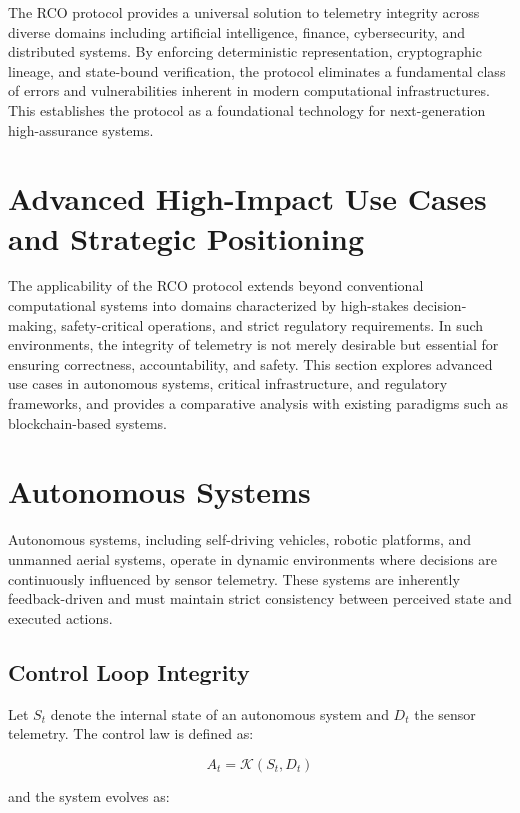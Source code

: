 The RCO protocol provides a universal solution to telemetry integrity across diverse domains including artificial intelligence, finance, cybersecurity, and distributed systems. By enforcing deterministic representation, cryptographic lineage, and state-bound verification, the protocol eliminates a fundamental class of errors and vulnerabilities inherent in modern computational infrastructures. This establishes the protocol as a foundational technology for next-generation high-assurance systems.

\section{Advanced High-Impact Use Cases and Strategic Positioning}

The applicability of the RCO protocol extends beyond conventional computational systems into domains characterized by high-stakes decision-making, safety-critical operations, and strict regulatory requirements. In such environments, the integrity of telemetry is not merely desirable but essential for ensuring correctness, accountability, and safety. This section explores advanced use cases in autonomous systems, critical infrastructure, and regulatory frameworks, and provides a comparative analysis with existing paradigms such as blockchain-based systems.

\section{Autonomous Systems}

Autonomous systems, including self-driving vehicles, robotic platforms, and unmanned aerial systems, operate in dynamic environments where decisions are continuously influenced by sensor telemetry. These systems are inherently feedback-driven and must maintain strict consistency between perceived state and executed actions.

\subsection{Control Loop Integrity}

Let $S_t$ denote the internal state of an autonomous system and $D_t$ the sensor telemetry. The control law is defined as:

\begin{equation}
A_t = \mathcal{K}(S_t, D_t)
\end{equation}

and the system evolves as:

